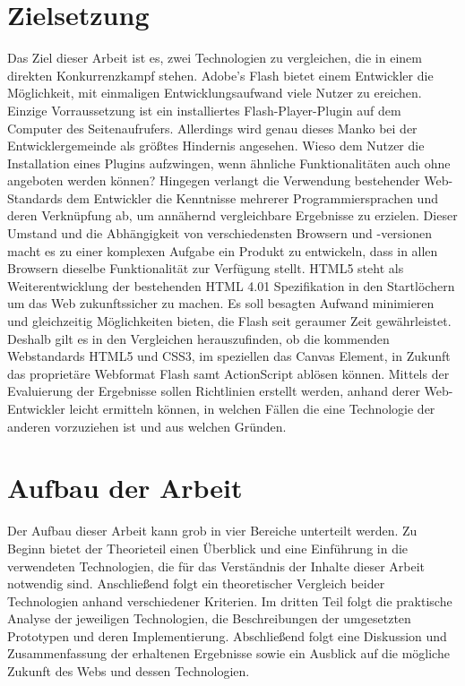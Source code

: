\section{Zielsetzung}
Das Ziel dieser Arbeit ist es, zwei Technologien zu vergleichen, die in einem
direkten Konkurrenzkampf stehen.
\newline\newline
Adobe's Flash bietet einem Entwickler die Möglichkeit, mit einmaligen
Entwicklungsaufwand viele Nutzer zu ereichen. Einzige Vorraussetzung ist ein
installiertes Flash-Player-Plugin auf dem Computer des Seitenaufrufers.
Allerdings wird genau dieses Manko bei der Entwicklergemeinde als größtes
Hindernis angesehen. Wieso dem Nutzer die Installation eines Plugins
aufzwingen, wenn ähnliche Funktionalitäten auch ohne angeboten werden können?
\newline\newline
Hingegen verlangt die Verwendung bestehender Web-Standards dem Entwickler die
Kenntnisse mehrerer Programmiersprachen und deren Verknüpfung ab, um annähernd
vergleichbare Ergebnisse zu erzielen. Dieser Umstand und die Abhängigkeit
von verschiedensten Browsern und -versionen macht es zu einer komplexen
Aufgabe ein Produkt zu entwickeln, dass in allen Browsern dieselbe
Funktionalität zur Verfügung stellt. HTML5 steht als Weiterentwicklung der
bestehenden HTML 4.01 Spezifikation in den Startlöchern um das Web
zukunftssicher zu machen. Es soll besagten Aufwand minimieren und gleichzeitig
Möglichkeiten bieten, die Flash seit geraumer Zeit gewährleistet.
\newline\newline
Deshalb gilt es in den Vergleichen herauszufinden, ob die kommenden
Webstandards HTML5 und CSS3, im speziellen das Canvas Element, in Zukunft das
proprietäre Webformat Flash samt ActionScript ablösen können. Mittels der
Evaluierung der Ergebnisse sollen Richtlinien erstellt werden, anhand derer
Web-Entwickler leicht ermitteln können, in welchen Fällen die eine Technologie
der anderen vorzuziehen ist und aus welchen Gründen.

\section{Aufbau der Arbeit}
Der Aufbau dieser Arbeit kann grob in vier Bereiche unterteilt werden.
Zu Beginn bietet der Theorieteil einen Überblick und eine Einführung in die
verwendeten Technologien, die für das Verständnis der Inhalte dieser Arbeit
notwendig sind. Anschließend folgt ein theoretischer Vergleich beider
Technologien anhand verschiedener Kriterien. Im dritten Teil folgt die
praktische Analyse der jeweiligen Technologien, die Beschreibungen der
umgesetzten Prototypen und deren Implementierung. Abschließend folgt eine
Diskussion und Zusammenfassung der erhaltenen Ergebnisse sowie ein Ausblick
auf die mögliche Zukunft des Webs und dessen Technologien.
